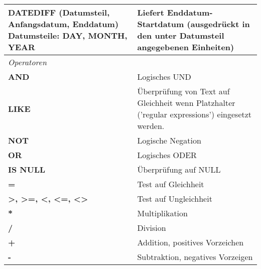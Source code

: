 \begin{center}
\begin{tabular}{|p{} | p{}|}
		\hline
		\textbf{DATEDIFF} (Datumsteil, Anfangsdatum, Enddatum) Datumsteile: \textbf{DAY, MONTH, YEAR} & Liefert Enddatum-Startdatum (ausgedrückt in den unter Datumsteil angegebenen Einheiten)\\
		\hline
		\rowcolor{tableLightGray} \textit{Operatoren} & \\
		\hline
		\textbf{AND} & Logisches UND\\
		\hline
		\textbf{LIKE} & Überprüfung von Text auf Gleichheit wenn Platzhalter ('regular expressions') eingesetzt werden.\\
		\hline
		\textbf{NOT} & Logische Negation\\
		\hline
		\textbf{OR} & Logisches ODER\\
		\hline
		\textbf{IS NULL} & Überprüfung auf NULL\\
		\hline
		\textbf{=} & Test auf Gleichheit\\
		\hline
		\textbf{>, >=, <, <=, <>} & Test auf Ungleichheit\\
		\hline
		\textbf{*} & Multiplikation\\
		\hline
		\textbf{/} & Division\\
		\hline
		\textbf{+} & Addition, positives Vorzeichen\\
		\hline
		\textbf{-} & Subtraktion, negatives Vorzeigen\\
		\hline
	\end{tabular}
\end{center}






